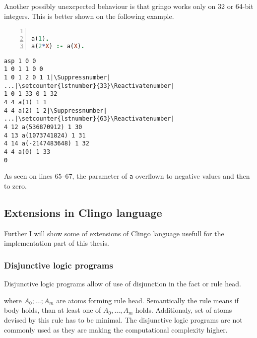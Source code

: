 \documentclass{fithesis}
\begin{document}
Another possibly unexcpected behaviour is that gringo works only on 32 or
64-bit integers. This is better shown on the following example.

\begin{minipage}[t]{0.45\linewidth}
\centering
\begin{lstlisting}[language=prolog, numbers=left, countblanklines=false]

a(1).
a(2*X) :- a(X).
\end{lstlisting}
\end{minipage}
\hspace{1em}
\begin{minipage}[t]{0.45\linewidth}
\centering
\begin{lstlisting}[numbers=right, countblanklines=false]
asp 1 0 0
1 0 1 1 0 0
1 0 1 2 0 1 1|\Suppressnumber|
...|\setcounter{lstnumber}{33}\Reactivatenumber|
1 0 1 33 0 1 32
4 4 a(1) 1 1
4 4 a(2) 1 2|\Suppressnumber|
...|\setcounter{lstnumber}{63}\Reactivatenumber|
4 12 a(536870912) 1 30
4 13 a(1073741824) 1 31
4 14 a(-2147483648) 1 32
4 4 a(0) 1 33
0
\end{lstlisting}
\end{minipage}
As seen on lines 65--67, the parameter of \texttt{a} overflown to negative
values and then to zero.

\subsection{Extensions in Clingo language}

Further I will show some of extensions of Clingo language usefull for
the implementation part of this thesis.

\subsubsection{Disjunctive logic programs}
Disjunctive logic programs allow of use of disjunction in the fact or rule head.
{\setlength{\tabcolsep}{0.2em}%
\begin{center}
\end{center}}\noindent
where $A_0; \dots; A_m$ are atoms forming rule head. Semantically the rule means
if body holds, than at least one of $A_0, \dots, A_m$ holds. Additionaly, set
of atoms devised by this rule has to be minimal.
The disjunctive logic programs are not commonly used as they are making
the computational complexity higher.
\end{document}
